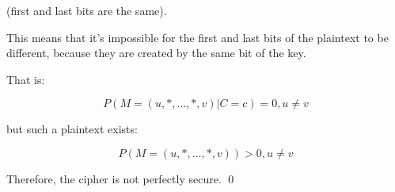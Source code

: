 (first and last bits are the same).

This means that it's impossible for the first and last bits of the plaintext to be different, because they are created by the same bit of the key.

That is:

\begin{equation}
P(M = (u, *, \ldots, *, v) | C = c) = 0, u \neq v
\end{equation}

but such a plaintext exists:

\begin{equation}
P(M = (u, *, \ldots, *, v)) > 0, u \neq v
\end{equation}

Therefore, the cipher is not perfectly secure. \qed

